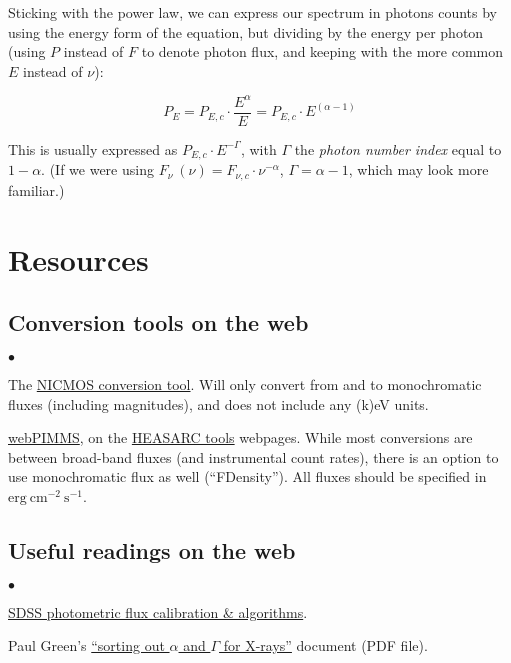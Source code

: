 \documentclass[12pt,a4paper]{article}
\newcommand{\fv}{\ensuremath{F_{\nu}}}
\newcommand{\fvc}{\ensuremath{F_{\nu, c}}}
\newcommand{\pEc}{\ensuremath{P_{E, c}}}
\newcommand{\ergcmsqs}{\ensuremath{\mathrm{erg}\ \mathrm{cm}^{-2}\ \mathrm{s^{-1}}}}
\begin{document}
Sticking with the power law, we can express our spectrum in photons counts by using the energy form of the equation, but dividing by the energy per photon (using $P$ instead of $F$ to denote photon flux, and keeping with the more common $E$ instead of $\nu$):

\begin{equation*}
P_E = \pEc \cdot \frac{E^{\alpha}}{E} = \pEc \cdot E^{(\alpha-1)}
\end{equation*}

This is usually expressed as $\pEc \cdot E^{-\Gamma}$, with $\Gamma$ the \emph{photon number index} equal to $1-\alpha$. (If we were using $\fv\ (\nu) = \fvc \cdot \nu^{-\alpha}$, $\Gamma = \alpha-1$, which may look more familiar.)


\section*{Resources}

\subsection*{Conversion tools on the web}

\begin{list}{$\bullet$}{\setlength{\rightmargin}{0cm} \setlength{\itemsep}{-2mm} \setlength{\leftmargin}{4mm} \setlength{\itemindent}{1mm}}
\item The \href{http://www.stsci.edu/hst/nicmos/tools/conversion_form.html}{NICMOS conversion tool}. Will only convert from and to monochromatic fluxes (including magnitudes), and does not include any (k)eV units.
\item \href{http://heasarc.nasa.gov/Tools/w3pimms.html}{webPIMMS}, on the \href{http://heasarc.nasa.gov/docs/tools.html}{HEASARC tools} webpages. While most conversions are between broad-band fluxes (and instrumental count rates), there is an option to use monochromatic flux as well (``FDensity''). All fluxes should be specified in \ergcmsqs.
\end{list}

\subsection*{Useful readings on the web}

\begin{list}{$\bullet$}{\setlength{\rightmargin}{0cm} \setlength{\itemsep}{-2mm} \setlength{\leftmargin}{4mm} \setlength{\itemindent}{1mm}}
\item \href{http://www.sdss.org/dr6/algorithms/fluxcal.html}{SDSS photometric flux calibration \& algorithms}.
\item Paul Green's \href{http://hea-www.harvard.edu/~pgreen/figs/xraydefs.pdf}{``sorting out $\alpha$ and $\Gamma$ for X-rays''} document (PDF file).
\end{list}




\end{document}
